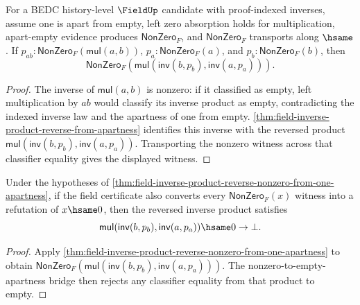 \begin{theorem}
\label{thm:field-inverse-product-reverse-nonzero-from-one-apartness}
For a BEDC history-level $\FieldUp$ candidate with proof-indexed inverses,
assume one is apart from empty, left zero absorption holds for multiplication,
apart-empty evidence produces $\mathsf{NonZero}_F$, and
$\mathsf{NonZero}_F$ transports along $\hsame$. If
$p_{ab}:\mathsf{NonZero}_F(\mathsf{mul}(a,b))$,
$p_a:\mathsf{NonZero}_F(a)$, and $p_b:\mathsf{NonZero}_F(b)$, then
$$
\mathsf{NonZero}_F(
  \mathsf{mul}(\mathsf{inv}(b,p_b),\mathsf{inv}(a,p_a))).
$$
\end{theorem}
\begin{proof}
The inverse of $\mathsf{mul}(a,b)$ is nonzero: if it classified as empty,
left multiplication by $a b$ would classify its inverse product as empty,
contradicting the indexed inverse law and the apartness of one from empty.
\autoref{thm:field-inverse-product-reverse-from-apartness} identifies this
inverse with the reversed product
$\mathsf{mul}(\mathsf{inv}(b,p_b),\mathsf{inv}(a,p_a))$.
Transporting the nonzero witness across that classifier equality gives the
displayed witness.
\end{proof}

\begin{theorem}
\label{thm:field-inverse-product-reverse-apart-empty-from-one-apartness}
Under the hypotheses of
\autoref{thm:field-inverse-product-reverse-nonzero-from-one-apartness}, if
the field certificate also converts every $\mathsf{NonZero}_F(x)$ witness into
a refutation of $x\hsame0$, then the reversed inverse product satisfies
$$
\mathsf{mul}(\mathsf{inv}(b,p_b),\mathsf{inv}(a,p_a))\hsame0\to\bot.
$$
\end{theorem}
\begin{proof}
Apply
\autoref{thm:field-inverse-product-reverse-nonzero-from-one-apartness} to
obtain
$\mathsf{NonZero}_F(\mathsf{mul}(\mathsf{inv}(b,p_b),\mathsf{inv}(a,p_a)))$.
The nonzero-to-empty-apartness bridge then rejects any classifier equality
from that product to empty.
\end{proof}

